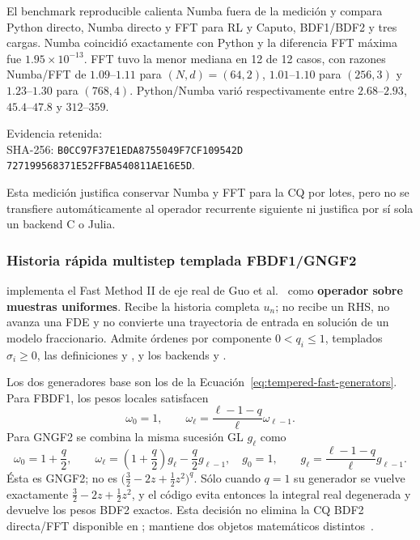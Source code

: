 El benchmark reproducible
 calienta Numba
fuera de la medición y compara Python directo, Numba directo y FFT para RL y
Caputo, BDF1/BDF2 y tres cargas. Numba coincidió exactamente con Python y la
diferencia FFT máxima fue \(1.95\times10^{-13}\). FFT tuvo la menor mediana en
12 de 12 casos, con razones Numba/FFT de \(1.09\)--\(1.11\) para
\((N,d)=(64,2)\), \(1.01\)--\(1.10\) para \((256,3)\) y
\(1.23\)--\(1.30\) para \((768,4)\). Python/Numba varió respectivamente entre
\(2.68\)--\(2.93\), \(45.4\)--\(47.8\) y \(312\)--\(359\).
\begin{flushleft}
\small
Evidencia retenida:
\\
SHA-256:
\texttt{B0CC97F37E1EDA87}\allowbreak\texttt{55049F7CF109542D}\allowbreak
\texttt{727199568371E52F}\allowbreak\texttt{FBA540811AE16E5D}.
\end{flushleft}
Esta medición justifica conservar Numba y FFT para la CQ por lotes, pero no se
transfiere automáticamente al operador recurrente siguiente ni justifica por
sí sola un backend C o Julia.

\subsubsection{Historia rápida multistep templada FBDF1/GNGF2}

 implementa el Fast Method II de eje
real de Guo et al.~\cite{GuoEtAl2019Tempered} como \textbf{operador sobre
muestras uniformes}. Recibe la historia completa \(u_n\); no recibe un RHS, no
avanza una FDE y no convierte una trayectoria de entrada en solución de un
modelo fraccionario. Admite órdenes por componente \(0<q_i\le1\), templados
\(\sigma_i\ge0\), las definiciones
 y , y los
backends  y .

Los dos generadores base son los de la
Ecuación~\eqref{eq:tempered-fast-generators}. Para FBDF1, los pesos locales
satisfacen
\[
 \omega_0=1,\qquad
 \omega_\ell=\frac{\ell-1-q}{\ell}\omega_{\ell-1}.
\]
Para GNGF2 se combina la misma sucesión GL \(g_\ell\) como
\[
 \omega_0=1+\frac q2,\qquad
 \omega_\ell=\left(1+\frac q2\right)g_\ell
              -\frac q2g_{\ell-1},
 \quad
 g_0=1,\qquad g_\ell=\frac{\ell-1-q}{\ell}g_{\ell-1}.
\]
Ésta es GNGF2; no es
\(\bigl(\tfrac32-2z+\tfrac12z^2\bigr)^q\). Sólo cuando \(q=1\) su generador
se vuelve exactamente \(\tfrac32-2z+\tfrac12z^2\), y el código evita entonces
la integral real degenerada y devuelve los pesos BDF2 exactos. Esta decisión
no elimina la CQ BDF2 directa/FFT disponible en
; mantiene dos objetos matemáticos
distintos~\cite{Lubich1986}.

